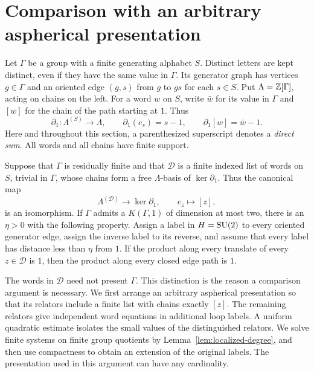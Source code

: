 \section{Comparison with an arbitrary aspherical presentation}
\label{sec:presentation}

Let $\Gamma$ be a group with a finite generating alphabet $S$.
Distinct letters are kept distinct, even if they have the same value in
$\Gamma$.  Its generator graph has vertices $g\in\Gamma$ and an oriented
edge $(g,s)$ from $g$ to $gs$ for each $s\in S$.
Put $\Lambda=\mathbb Z[\Gamma]$, acting on chains on the left.  For a word $w$
on $S$, write $\bar w$ for its value in $\Gamma$ and $[w]$ for the chain
of the path starting at $1$.  Thus
\[
 \partial_1:\Lambda^{(S)}\longrightarrow\Lambda,
 \qquad \partial_1(e_s)=s-1,
 \qquad \partial_1[w]=\bar w-1.
\]
Here and throughout this section, a parenthesized superscript denotes a
\emph{direct sum}.  All words and all chains have finite support.

\begin{theorem}
\label{thm:presentation}
Suppose that $\Gamma$ is residually finite and that $\mathcal D$ is a
finite indexed list of words on $S$, trivial in $\Gamma$, whose chains
form a free $\Lambda$-basis of $\ker\partial_1$.  Thus the canonical map
\begin{equation}\label{eq:cycle-basis}
 \Lambda^{(\mathcal D)}\longrightarrow\ker\partial_1,
 \qquad e_z\longmapsto[z],
\end{equation}
is an isomorphism.
If $\Gamma$ admits a $K(\Gamma,1)$ of dimension at most two, there is an
$\eta>0$ with the following property.  Assign a label in $H=\operatorname{SU}(2)$ to
every oriented generator edge, assign the inverse label to its reverse,
and assume that every label has distance less than $\eta$ from $1$.
If the product along every translate of every $z\in\mathcal D$ is $1$,
then the product along every closed edge path is $1$.
\end{theorem}

The words in $\mathcal D$ need not present $\Gamma$.  This distinction is
the reason a comparison argument is necessary.  We first arrange an
arbitrary aspherical presentation so that its relators include a finite
list with chains exactly $[z]$.  The remaining relators give independent
word equations in additional loop labels.  A uniform quadratic estimate
isolates the small values of the distinguished relators.  We solve finite
systems on finite group quotients by Lemma~\ref{lem:localized-degree},
and then use compactness to obtain an extension of the original labels.
The presentation used in this argument can have any cardinality.

